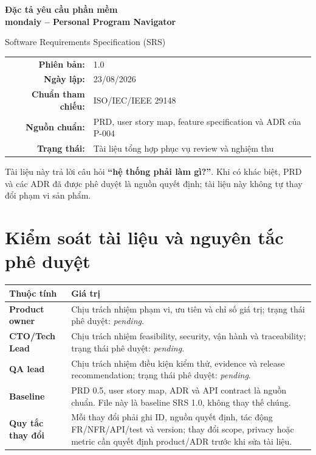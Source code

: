 \documentclass[11pt,a4paper]{article}
\begin{document}
\begin{titlepage}
\centering
\vspace*{2.4cm}
{\Huge\bfseries\color{mondaiyblue} Đặc tả yêu cầu phần mềm\\[0.2cm]
mondaiy -- Personal Program Navigator\par}
\vspace{0.9cm}
{\Large Software Requirements Specification (SRS)\par}
\vfill
\begin{tabular}{rl}
\textbf{Phiên bản:} & 1.0 \\
\textbf{Ngày lập:} & 23/08/2026 \\
\textbf{Chuẩn tham chiếu:} & ISO/IEC/IEEE 29148 \\
\textbf{Nguồn chuẩn:} & PRD, user story map, feature specification và ADR của P-004 \\
\textbf{Trạng thái:} & Tài liệu tổng hợp phục vụ review và nghiệm thu \\
\end{tabular}
\vfill
\colorbox{mondaiylight}{\parbox{0.86\textwidth}{Tài liệu này trả lời câu hỏi \textbf{``hệ thống phải làm gì?''}. Khi có khác biệt, PRD và các ADR đã được phê duyệt là nguồn quyết định; tài liệu này không tự thay đổi phạm vi sản phẩm.}}
\end{titlepage}

\tableofcontents\clearpage

\section{Kiểm soát tài liệu và nguyên tắc phê duyệt}
\begin{tabularx}{\textwidth}{>{\bfseries}p{3.5cm}X}
\toprule Thuộc tính & Giá trị \\ \midrule
Product owner & Chịu trách nhiệm phạm vi, ưu tiên và chỉ số giá trị; trạng thái phê duyệt: \emph{pending}. \\
CTO/Tech Lead & Chịu trách nhiệm feasibility, security, vận hành và traceability; trạng thái phê duyệt: \emph{pending}. \\
QA lead & Chịu trách nhiệm điều kiện kiểm thử, evidence và release recommendation; trạng thái phê duyệt: \emph{pending}. \\
Baseline & PRD 0.5, user story map, ADR và API contract là nguồn chuẩn. File này là baseline SRS 1.0, không thay thế chúng. \\
Quy tắc thay đổi & Mỗi thay đổi phải ghi ID, nguồn quyết định, tác động FR/NFR/API/test và version; thay đổi scope, privacy hoặc metric cần quyết định product/ADR trước khi sửa tài liệu. \\
\bottomrule
\end{tabularx}
\end{document}
